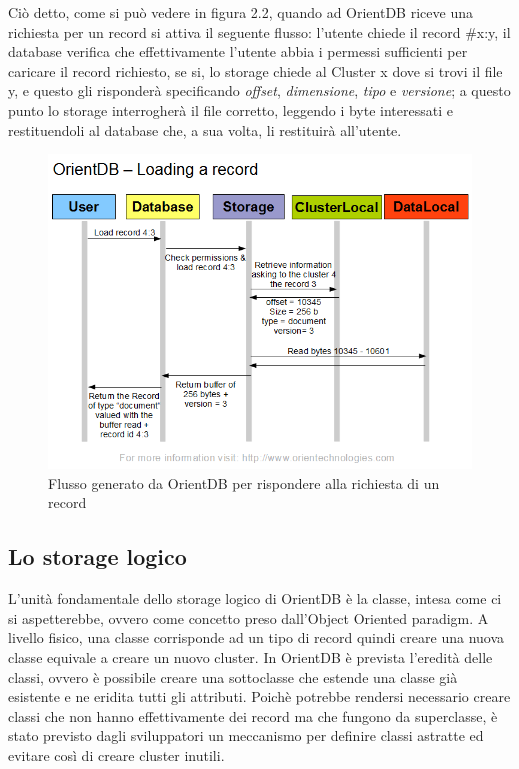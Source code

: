 Ciò detto, come si può vedere in figura 2.2, quando ad OrientDB riceve una richiesta per un record si attiva il seguente flusso: l'utente chiede il record \#x:y, il database verifica che effettivamente l'utente abbia i permessi sufficienti per caricare il record richiesto, se si, lo storage chiede al Cluster x dove si trovi il file y, e questo gli risponderà specificando \emph{offset}, \emph{dimensione}, \emph{tipo} e \emph{versione}; a questo punto lo storage interrogherà il file corretto, leggendo i byte interessati e restituendoli al database che, a sua volta, li restituirà all'utente.
\begin{figure}[t]
\centering
\includegraphics[scale=0.5]{./orientFlow.png}
\caption{Flusso generato da OrientDB per rispondere alla richiesta di un record}
\label{fig:2}
\end{figure}

\subsection{Lo storage logico}
L'unità fondamentale dello storage logico di OrientDB è la classe, intesa come ci si aspetterebbe, ovvero come concetto preso dall'Object Oriented paradigm. A livello fisico, una classe corrisponde ad un tipo di record quindi creare una nuova classe equivale a creare un nuovo cluster.
In OrientDB è prevista l'eredità delle classi, ovvero è possibile creare una sottoclasse che estende una classe già esistente e ne eridita tutti gli attributi. Poichè potrebbe rendersi necessario creare classi che non hanno effettivamente dei record ma che fungono da superclasse, è stato previsto dagli sviluppatori un meccanismo per definire classi astratte ed evitare così di creare cluster inutili.

